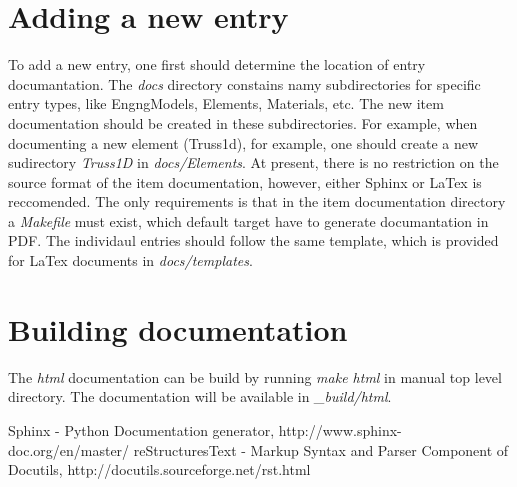 \documentclass[11pt]{article}
\begin{document}
\section{Adding a new entry}
To add a new entry, one first should determine the location of entry documantation. The {\em docs} directory constains namy subdirectories for specific entry types, like EngngModels, Elements, Materials, etc. The new item documentation should be created in these subdirectories. For example, when documenting a new element (Truss1d), for example, one should create a new sudirectory {\em Truss1D} in {\em docs/Elements}. At present, there is no restriction on the source format of the item documentation, however, either Sphinx or LaTex is reccomended. The only requirements is that in the item documentation directory a {\em Makefile} must exist, which default target have to generate documantation in PDF. The individaul entries should follow the same template, which is provided for LaTex documents in {\em docs/templates}. 

\section{Building documentation}
The {\em html} documentation can be build by running {\em make html} in manual top level directory. The documentation will be available in {\em \_build/html}.

\begin{thebibliography}{1}
Sphinx - Python Documentation generator, http://www.sphinx-doc.org/en/master/
reStructuresText - Markup Syntax and Parser Component of Docutils, http://docutils.sourceforge.net/rst.html
\end{thebibliography}
\end{document}
